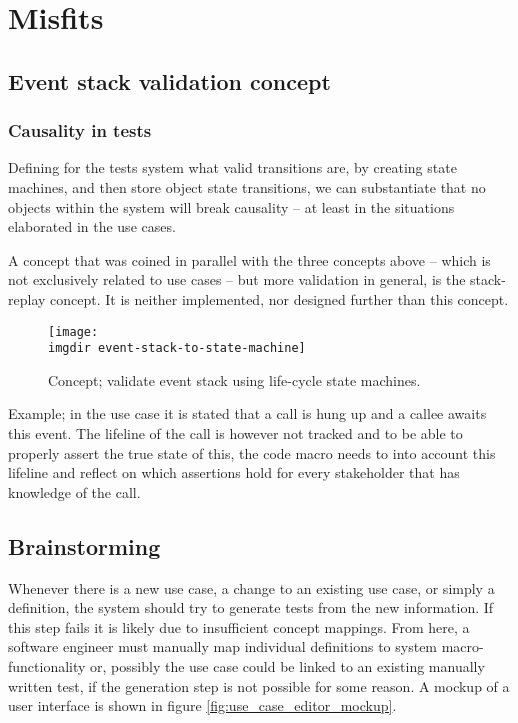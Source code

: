 \chapter{Misfits}

\section{Event stack validation concept}
\label{appendix:event-stack-validation}
\subsection{Causality in tests}
Defining for the tests system what valid transitions are, by creating state machines, and then store object state transitions, we can substantiate that no objects within the system will break causality -- at least in the situations elaborated in the use cases.

A concept that was coined in parallel with the three concepts above -- which is not exclusively related to use cases -- but more validation in general, is the stack-replay concept. It is neither implemented, nor designed further than this concept.
\begin{figure}[ht]
\centering
\texttt{[image: \\imgdir event-stack-to-state-machine]}
\caption{Concept; validate event stack using life-cycle state machines.}
\label{fig:event-stack-to-state-machine}
\end{figure}
Example; in the use case it is stated that a call is hung up and a callee awaits this event. The lifeline of the call is however not tracked and to be able to properly assert the true state of this, the code macro needs to into account this lifeline and reflect on which assertions hold for every stakeholder that has knowledge of the call. %


\section{Brainstorming}
Whenever there is a new use case, a change to an existing use case, or simply a definition, the system should try to generate tests from the new information. If this step fails it is likely due to insufficient concept mappings. From here, a software engineer must manually map individual definitions to system macro-functionality or, possibly the use case could be linked to an existing manually written test, if the generation step is not possible for some reason. A mockup of a user interface is shown in figure \ref{fig:use_case_editor_mockup}.

